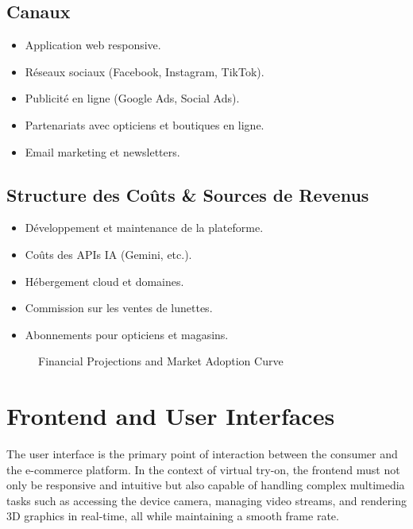 \subsection{Canaux}
\begin{itemize}
    \item Application web responsive.
    \item Réseaux sociaux (Facebook, Instagram, TikTok).
    \item Publicité en ligne (Google Ads, Social Ads).
    \item Partenariats avec opticiens et boutiques en ligne.
    \item Email marketing et newsletters.
\end{itemize}

\subsection{Structure des Coûts \& Sources de Revenus}
\begin{itemize}
    \item Développement et maintenance de la plateforme.
    \item Coûts des APIs IA (Gemini, etc.).
    \item Hébergement cloud et domaines.
    \item Commission sur les ventes de lunettes.
    \item Abonnements pour opticiens et magasins.
\end{itemize}

\begin{figure}[H]
    \centering
    \vspace{8cm}
    \caption{Financial Projections and Market Adoption Curve}
    \label{fig:financial_adoption}
\end{figure}

\section{Frontend and User Interfaces}
\label{sec:back_frontend}

The user interface is the primary point of interaction between the consumer and the e-commerce platform. In the context of virtual try-on, the frontend must not only be responsive and intuitive but also capable of handling complex multimedia tasks such as accessing the device camera, managing video streams, and rendering 3D graphics in real-time, all while maintaining a smooth frame rate.

